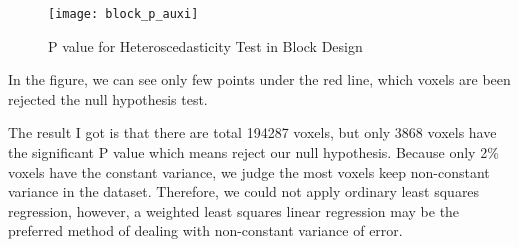 \begin{figure}[!h]
\centering
\texttt{[image: block\_p\_auxi]}
\caption{P value for Heteroscedasticity Test in Block Design}
\end{figure}

In the figure, we can see only few points under the red line, which voxels are
been rejected the null hypothesis test. 

The result I got is that there are total 194287 voxels, but only 3868 voxels 
have the significant P value which means reject our null hypothesis. Because 
only 2\% voxels have the constant variance, we judge the most voxels keep 
non-constant variance in the dataset. Therefore, we could not apply ordinary 
least squares regression, however, a weighted least squares linear regression 
may be the preferred method of dealing with non-constant variance of error.

